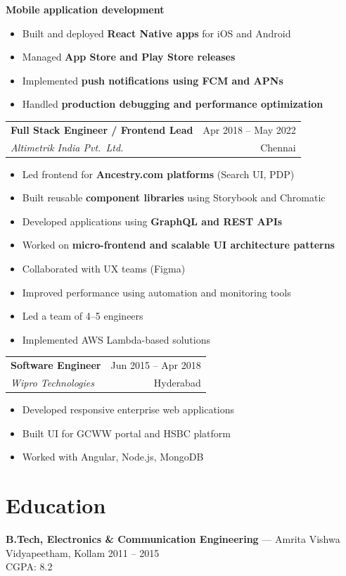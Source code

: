 \documentclass[11pt,a4paper]{article}
\makeatletter
\newcommand{\jobtitle}[4]{%
  \vspace{0.35em}
  \noindent
  \begin{tabular*}{\linewidth}{@{}l@{\extracolsep{\fill}}r@{}}
    \textbf{#2} & \small\color{textmuted}#1 \\
    \textit{\color{textmuted}#3} & \small\color{textmuted}#4 \\
  \end{tabular*}\par
  \vspace{0.25em}
}
\newcommand{\subproject}[2]{%
  \vspace{0.35em}
  \noindent\textbf{#1}\textit{\small\color{textmuted}\ #2}\par
}
\makeatother
\begin{document}
\subproject{Mobile application development}{}
\begin{itemize}
\item Built and deployed \textbf{React Native apps} for iOS and Android
\item Managed \textbf{App Store and Play Store releases}
\item Implemented \textbf{push notifications using FCM and APNs}
\item Handled \textbf{production debugging and performance optimization}
\end{itemize}

\jobtitle{Apr 2018 -- May 2022}{Full Stack Engineer / Frontend Lead}{Altimetrik India Pvt.\ Ltd.}{Chennai}
\begin{itemize}
\item Led frontend for \textbf{Ancestry.com platforms} (Search UI, PDP)
\item Built reusable \textbf{component libraries} using Storybook and Chromatic
\item Developed applications using \textbf{GraphQL and REST APIs}
\item Worked on \textbf{micro-frontend and scalable UI architecture patterns}
\item Collaborated with UX teams (Figma)
\item Improved performance using automation and monitoring tools
\item Led a team of 4--5 engineers
\item Implemented AWS Lambda-based solutions
\end{itemize}

\jobtitle{Jun 2015 -- Apr 2018}{Software Engineer}{Wipro Technologies}{Hyderabad}
\begin{itemize}
\item Developed responsive enterprise web applications
\item Built UI for GCWW portal and HSBC platform
\item Worked with Angular, Node.js, MongoDB
\end{itemize}

\section{Education}
\textbf{B.Tech, Electronics \& Communication Engineering} --- Amrita Vishwa Vidyapeetham, Kollam \hfill \textcolor{textmuted}{\small 2011 -- 2015}\\
\textcolor{textmuted}{\small CGPA: 8.2}
\end{document}
